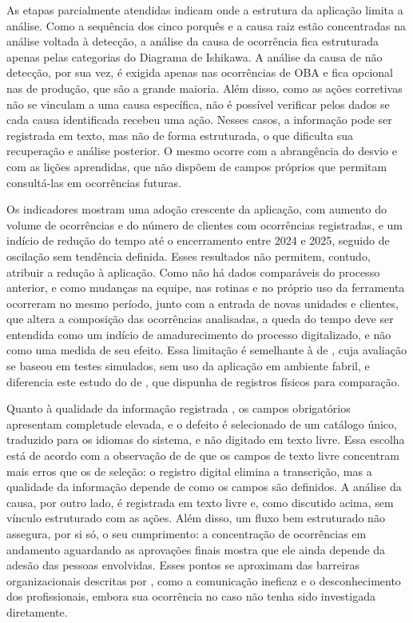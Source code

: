 As etapas parcialmente atendidas indicam onde a estrutura da aplicação limita a análise. Como a sequência dos cinco porquês e a causa raiz estão concentradas na análise voltada à detecção, a análise da causa de ocorrência fica estruturada apenas pelas categorias do Diagrama de Ishikawa. A análise da causa de não detecção, por sua vez, é exigida apenas nas ocorrências de OBA e fica opcional nas de produção, que são a grande maioria. Além disso, como as ações corretivas não se vinculam a uma causa específica, não é possível verificar pelos dados se cada causa identificada recebeu uma ação. Nesses casos, a informação pode ser registrada em texto, mas não de forma estruturada, o que dificulta sua recuperação e análise posterior. O mesmo ocorre com a abrangência do desvio e com as lições aprendidas, que não dispõem de campos próprios que permitam consultá-las em ocorrências futuras.

Os indicadores mostram uma adoção crescente da aplicação, com aumento do volume de ocorrências e do número de clientes com ocorrências registradas, e um indício de redução do tempo até o encerramento entre 2024 e 2025, seguido de oscilação sem tendência definida. Esses resultados não permitem, contudo, atribuir a redução à aplicação. Como não há dados comparáveis do processo anterior, e como mudanças na equipe, nas rotinas e no próprio uso da ferramenta ocorreram no mesmo período, junto com a entrada de novas unidades e clientes, que altera a composição das ocorrências analisadas, a queda do tempo deve ser entendida como um indício de amadurecimento do processo digitalizado, e não como uma medida de seu efeito. Essa limitação é semelhante à de , cuja avaliação se baseou em testes simulados, sem uso da aplicação em ambiente fabril, e diferencia este estudo do de , que dispunha de registros físicos para comparação.

Quanto à qualidade da informação registrada \cite[p.~24637]{cichyrass2019}, os campos obrigatórios apresentam completude elevada, e o defeito é selecionado de um catálogo único, traduzido para os idiomas do sistema, e não digitado em texto livre. Essa escolha está de acordo com a observação de  de que os campos de texto livre concentram mais erros que os de seleção: o registro digital elimina a transcrição, mas a qualidade da informação depende de como os campos são definidos. A análise da causa, por outro lado, é registrada em texto livre e, como discutido acima, sem vínculo estruturado com as ações. Além disso, um fluxo bem estruturado não assegura, por si só, o seu cumprimento: a concentração de ocorrências em andamento aguardando as aprovações finais mostra que ele ainda depende da adesão das pessoas envolvidas. Esses pontos se aproximam das barreiras organizacionais descritas por , como a comunicação ineficaz e o desconhecimento dos profissionais, embora sua ocorrência no caso não tenha sido investigada diretamente.

